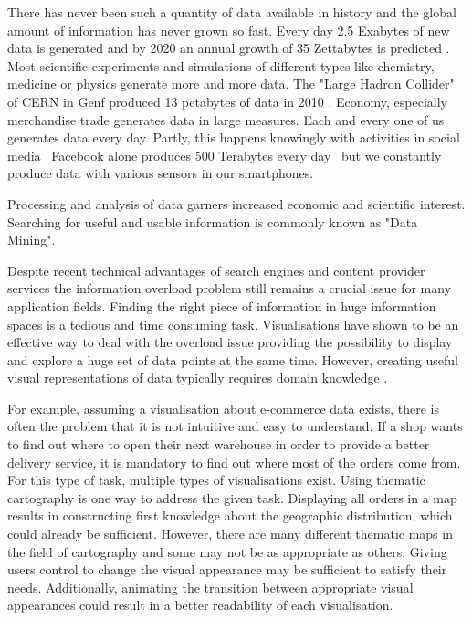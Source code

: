 There has never been such a quantity of data available in history and the global amount of information has never grown so fast. Every day 2.5 Exabytes of new data is generated and by 2020 an annual growth of 35 Zettabytes is predicted . Most scientific experiments and simulations of different types like chemistry, medicine or physics generate more and more data. The "Large Hadron Collider" of CERN in Genf produced 13 petabytes of data in 2010 . Economy, especially merchandise trade generates data in large measures. Each and every one of us generates data every day. Partly, this happens knowingly with activities in social media \textendash\ Facebook alone produces 500 Terabytes every day  \textendash\ but we constantly produce data with various sensors in our smartphones.

Processing and analysis of data garners increased economic and scientific interest. Searching for useful and usable information is commonly known as "Data Mining".

Despite recent technical advantages of search engines and content provider services the information overload problem still remains a crucial issue for many application fields. Finding the right piece of information in huge information spaces is a tedious and time consuming task. Visualisations have shown to be an effective way to deal with the overload issue providing the possibility to display and explore a huge set of data points at the same time. However, creating useful visual representations of data typically requires domain knowledge .

For example, assuming a visualisation about e-commerce data exists, there is often the problem that it is not intuitive and easy to understand. If a shop wants to find out where to open their next warehouse in order to provide a better delivery service, it is mandatory to find out where most of the orders come from. For this type of task, multiple types of visualisations exist. Using thematic cartography is one way to address the given task. Displaying all orders in a map results in constructing first knowledge about the geographic distribution, which could already be sufficient. However, there are many different thematic maps in the field of cartography and some may not be as appropriate as others. Giving users control to change the visual appearance may be sufficient to satisfy their needs. Additionally, animating the transition between appropriate visual appearances could result in a better readability of each visualisation.

